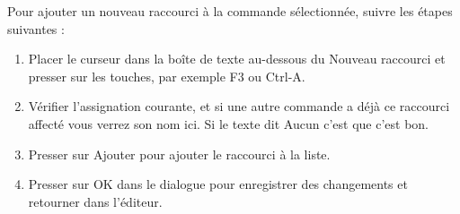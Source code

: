 Pour ajouter un nouveau raccourci à la commande sélectionnée, suivre les étapes suivantes :

\begin{enumerate}
\item Placer le curseur dans la boîte de texte au-dessous du Nouveau raccourci et presser sur les touches, par exemple F3 ou Ctrl-A.
\item Vérifier l'assignation courante, et si une autre commande a déjà ce raccourci affecté vous verrez son nom ici. Si le texte dit Aucun c'est que c'est bon.
\item Presser sur Ajouter pour ajouter le raccourci à la liste.
\item Presser sur OK dans le dialogue pour enregistrer des changements et retourner dans l'éditeur.
\end{enumerate}


